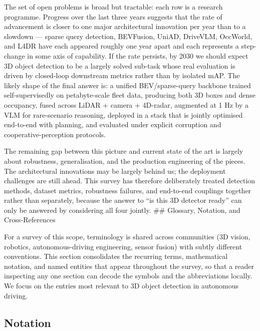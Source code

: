 The set of open problems is broad but tractable: each row is a research programme. Progress over the last three years suggests that the rate of advancement is closer to one major architectural innovation per year than to a slowdown --- sparse query detection, BEVFusion, UniAD, DriveVLM, OccWorld, and L4DR have each appeared roughly one year apart and each represents a step-change in some axis of capability. If the rate persists, by 2030 we should expect 3D object detection to be a largely solved sub-task whose real evaluation is driven by closed-loop downstream metrics rather than by isolated mAP. The likely shape of the final answer is: a unified BEV/sparse-query backbone trained self-supervisedly on petabyte-scale fleet data, producing both 3D boxes and dense occupancy, fused across LiDAR + camera + 4D-radar, augmented at 1 Hz by a VLM for rare-scenario reasoning, deployed in a stack that is jointly optimised end-to-end with planning, and evaluated under explicit corruption and cooperative-perception protocols.

The remaining gap between this picture and current state of the art is largely about robustness, generalisation, and the production engineering of the pieces. The architectural innovations may be largely behind us; the deployment challenges are still ahead. This survey has therefore deliberately treated detection methods, dataset metrics, robustness failures, and end-to-end couplings together rather than separately, because the answer to ``is this 3D detector ready'' can only be answered by considering all four jointly.
\#\# Glossary, Notation, and Cross-References

For a survey of this scope, terminology is shared across communities (3D vision, robotics, autonomous-driving engineering, sensor fusion) with subtly different conventions. This section consolidates the recurring terms, mathematical notation, and named entities that appear throughout the survey, so that a reader inspecting any one section can decode the symbols and the abbreviations locally. We focus on the entries most relevant to 3D object detection in autonomous driving.

\subsection{Notation}\label{notation}

